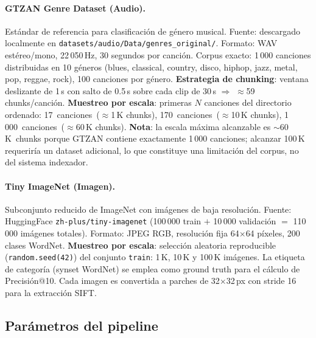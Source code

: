 \documentclass[12pt,a4paper]{article}
\begin{document}
\paragraph{GTZAN Genre Dataset (Audio).}
Estándar de referencia para clasificación de género musical.
Fuente: descargado localmente en \texttt{datasets/audio/Data/genres\_original/}.
Formato: WAV estéreo/mono, 22\,050\,Hz, 30 segundos por canción.
Corpus exacto: 1\,000 canciones distribuidas en 10 géneros
(blues, classical, country, disco, hiphop, jazz, metal, pop, reggae, rock),
100 canciones por género.
\textbf{Estrategia de chunking}: ventana deslizante de 1\,s con salto de 0.5\,s
sobre cada clip de 30\,s $\Rightarrow$ $\approx$59 chunks/canción.
\textbf{Muestreo por escala}: primeras $N$ canciones del directorio ordenado:
17~canciones~($\approx$1\,K chunks), 170~canciones~($\approx$10\,K chunks),
1\,000~canciones~($\approx$60\,K chunks).
\textbf{Nota}: la escala máxima alcanzable es $\sim$60\,K~chunks porque GTZAN
contiene exactamente 1\,000 canciones; alcanzar 100\,K requeriría un dataset
adicional, lo que constituye una limitación del corpus, no del sistema indexador.

\paragraph{Tiny ImageNet (Imagen).}
Subconjunto reducido de ImageNet con imágenes de baja resolución.
Fuente: HuggingFace \texttt{zh-plus/tiny-imagenet}
(100\,000 train $+$ 10\,000 validación $=$ 110\,000 imágenes totales).
Formato: JPEG RGB, resolución fija 64$\times$64 píxeles, 200 clases WordNet.
\textbf{Muestreo por escala}: selección aleatoria reproducible
(\texttt{random.seed(42)}) del conjunto \texttt{train}:
1\,K, 10\,K y 100\,K imágenes.
La etiqueta de categoría (synset WordNet) se emplea como ground truth
para el cálculo de Precisión@10.
Cada imagen es convertida a parches de 32$\times$32\,px con stride 16
para la extracción SIFT.

\subsection{Parámetros del pipeline}
\end{document}
